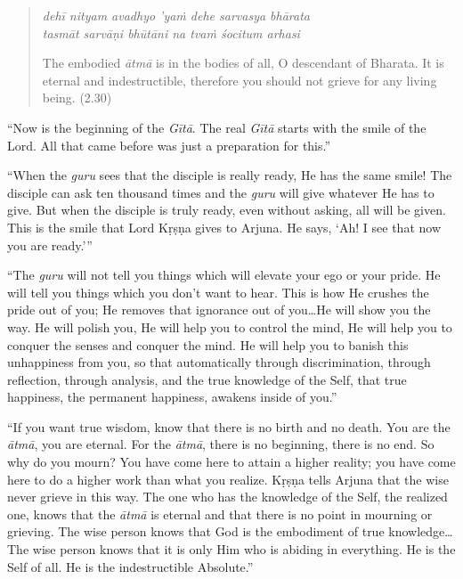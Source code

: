 \documentclass[12pt, twoside, openright]{memoir}
\begin{document}
\par
\begin{verse}
\textit{dehī nityam avadhyo ’yaṁ dehe sarvasya bhārata} \\
\textit{tasmāt sarvāṇi bhūtāni na tvaṁ śocitum arhasi}

\noindent The embodied \textit{ātmā} is in the bodies of all, O descendant of Bharata. It is eternal and indestructible, therefore you should not grieve for any living being. (2.30)
\end{verse}
\par


\enquote{Now is the beginning of the \textit{Gītā}. The real \textit{Gītā} starts with the smile of the Lord. All that came before was just a preparation for this.}

\enquote{When the \textit{guru} sees that the disciple is really ready, He has the same smile! The disciple can ask ten thousand times and the \textit{guru} will give whatever He has to give. But when the disciple is truly ready, even without asking, all will be given. This is the smile that Lord Kṛṣṇa gives to Arjuna. He says, \enquote{Ah! I see that now you are ready.}}

\enquote{The \textit{guru} will not tell you things which will elevate your ego or your pride. He will tell you things which you don’t want to hear. This is how He crushes the pride out of you; He removes that ignorance out of you\ldots He will show you the way. He will polish you, He will help you to control the mind, He will help you to conquer the senses and conquer the mind. He will help you to banish this unhappiness from you, so that automatically through discrimination, through reflection, through analysis, and the true knowledge of the Self, that true happiness, the permanent happiness, awakens inside of you.}

\enquote{If you want true wisdom, know that there is no birth and no death. You are the \textit{ātmā}, you are eternal. For the \textit{ātmā}, there is no beginning, there is no end. So why do you mourn? You have come here to attain a higher reality; you have come here to do a higher work than what you realize. Kṛṣṇa tells Arjuna that the wise never grieve in this way. The one who has the knowledge of the Self, the realized one, knows that the \textit{ātmā} is eternal and that there is no point in mourning or grieving. The wise person knows that God is the embodiment of true knowledge\ldots The wise person knows that it is only Him who is abiding in everything. He is the Self of all. He is the indestructible Absolute.}
\end{document}
